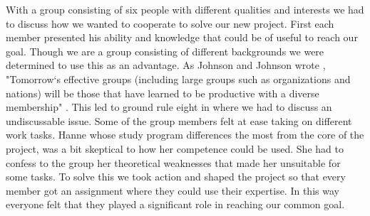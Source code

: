 With a group consisting of six people with different qualities and interests we had to discuss how we wanted to cooperate to solve our new project. First each member presented his ability and knowledge that could be of useful to reach our goal. Though we are a group consisting of different backgrounds we were determined to use this as an advantage. As Johnson and Johnson wrote \cite{ValuingDiversity}, "Tomorrow`s effective groups (including large groups such as organizations and nations) will be those that have learned to be productive with a diverse membership" . This led to ground rule eight in \cite{EffectiveGroups} where we had to discuss an undiscussable issue. Some of the group members felt at ease taking on different work tasks. Hanne whose study program differences the most from the core of the project, was a bit skeptical to how her competence could be used. She had to confess to the group her theoretical weaknesses that made her unsuitable for some tasks. To solve this we took action and shaped the project so that every member got an assignment where they could use their expertise. In this way everyone felt that they played a significant role in reaching our common goal. 